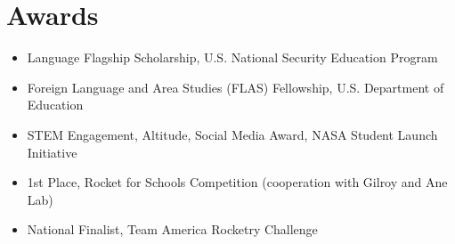 \documentclass{mycv}
\begin{document}
\section{Awards}
\begin{itemize}
    \item{Language Flagship Scholarship, U.S. National Security
    Education Program }
    \item{Foreign Language and Area Studies (FLAS) Fellowship, U.S. Department of Education }
    \item {STEM Engagement, Altitude, Social Media Award, NASA Student Launch Initiative }
    \item {1st Place, Rocket for Schools Competition (cooperation with Gilroy and Ane Lab) }
    \item National Finalist, Team America Rocketry Challenge 
\end{itemize}
\fi
\thispagestyle{empty} 
\end{document}

